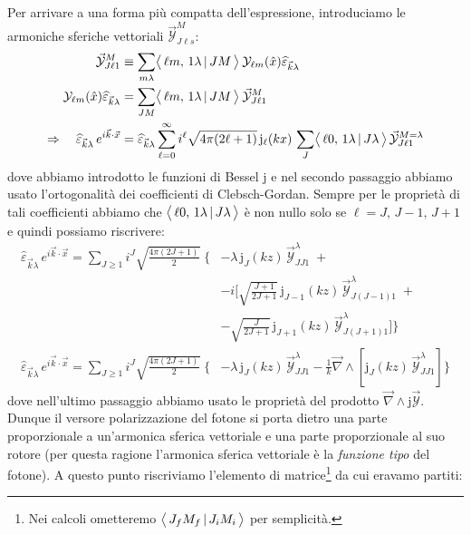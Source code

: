 Per arrivare a una forma più compatta dell'espressione, introduciamo le armoniche sferiche vettoriali $\vec{\mathcal{Y}}^M_{J\ell s}$:
\begin{displaymath}
\begin{aligned}
\vec{\mathcal{Y}}^M_{J\ell 1} &\equiv \sum_{m\lambda} \bigl\langle\, \ell m ,\, 1\lambda\, |\, JM\, \bigr\rangle\: \mathcal{Y}_{\ell m} (\hat{x}) \widehat{\varepsilon}_{\vec{k}\lambda} \\
\mathcal{Y}_{\ell m} (\hat{x}) \widehat{\varepsilon}_{\vec{k}\lambda} &= \sum_{JM} \bigl\langle\, \ell m ,\, 1\lambda\, |\, JM\, \bigr\rangle \: \vec{\mathcal{Y}}^M_{J\ell 1} \\
\Rightarrow\quad \widehat{\varepsilon}_{\vec{k}\lambda}\, e^{i\vec{k}\cdot\vec{x}} &= \widehat{\varepsilon}_{\vec{k}\lambda} \sum_{\ell=0}^\infty i^\ell \sqrt{4\pi(2\ell+1)}\, \mathrm{j}_\ell (kx) \, \sum_J \bigl\langle\, \ell 0 ,\, 1\lambda\, |\, J\lambda\, \bigr\rangle\, \vec{\mathcal{Y}}^{M=\lambda}_{J\ell 1}
\end{aligned}
\end{displaymath}
dove abbiamo introdotto le funzioni di Bessel $\mathrm{j}$ e nel secondo passaggio abbiamo usato l'ortogonalità dei coefficienti di Clebsch-Gordan. Sempre per le proprietà di tali coefficienti abbiamo che $\bigl\langle\, \ell 0,\, 1\lambda\, |\, J\lambda\, \bigr\rangle$ è non nullo solo se $\ell = J,\,J-1,\,J+1$ e quindi possiamo riscrivere:
\begin{displaymath}
\begin{aligned}
\widehat{\varepsilon}_{\vec{k}\lambda}\, e^{i\vec{k}\cdot\vec{x}} = \sum_{J \geq 1} i^J \sqrt{\frac{4\pi (2J+1)}{2}} \;\Biggl \{& -\lambda \,\mathrm{j}_J (kz) \, \vec{\mathcal{Y}}^\lambda_{JJ1}\; + \\
&-i\Biggl [\sqrt{\frac{J+1}{2J+1}} \,\mathrm{j}_{J-1} (kz) \, \vec{\mathcal{Y}}^\lambda_{J(J-1)1}\; + \\
& -\sqrt{\frac{J}{2J+1}} \,\mathrm{j}_{J+1} (kz) \, \vec{\mathcal{Y}}^\lambda_{J(J+1)1} \Biggr ] \Biggr \} \\
%
\widehat{\varepsilon}_{\vec{k}\lambda}\, e^{i\vec{k}\cdot\vec{x}} = \sum_{J \geq 1} i^J \sqrt{\frac{4\pi (2J+1)}{2}} \;\Biggl \{&-\lambda\,\mathrm{j}_J (kz) \, \vec{\mathcal{Y}}^\lambda_{JJ1} - \frac{1}{k} \vec{\nabla}\land [\mathrm{j}_J (kz)\, \vec{\mathcal{Y}}^\lambda_{JJ1}]\Biggr \}
\end{aligned}
\end{displaymath}
dove nell'ultimo passaggio abbiamo usato le proprietà del prodotto $\vec{\nabla}\land \mathrm{j}\vec{\mathcal{Y}}$. Dunque il versore polarizzazione del fotone si porta dietro una parte proporzionale a un'armonica sferica vettoriale e una parte proporzionale al suo rotore (per questa ragione l'armonica sferica vettoriale è la \textit{funzione tipo} del fotone). A questo punto riscriviamo l'elemento di matrice\footnote{Nei calcoli ometteremo $\bigl\langle\, J_f M_f\, |\, J_i M_i\, \bigr\rangle$ per semplicità.} da cui eravamo partiti:

